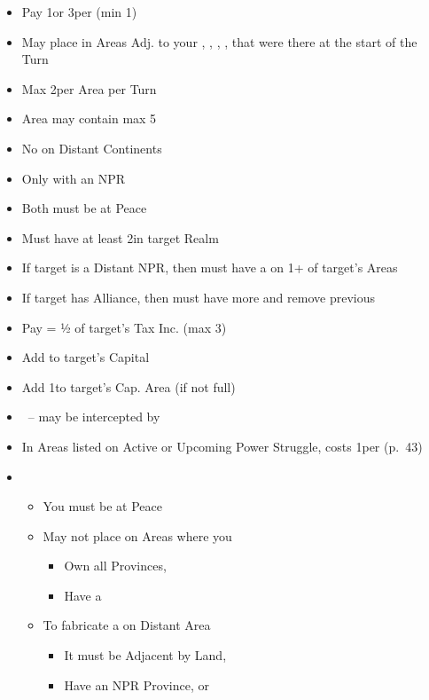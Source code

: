 \documentclass[10pt]{article}
\begin{document}
\begin{itemize}
	\item Pay 1\diplopower or 3\ducats per \influence (min 1\diplopower)
	\item May place \influence in Areas Adj. to your \towns, \vassals, \alliances, \marriages, \influence that were there at the start of the Turn
	\item Max 2\influence per Area per Turn
	\item Area may contain max 5\influence
	\item No \influence on Distant Continents
\end{itemize}

\begin{itemize}
	\item Only with an NPR
	\item Both must be at Peace
	\item Must have at least 2\influence in target Realm
	\item If target is a Distant NPR, then must have a \claim on 1+ of target's Areas
	\item If target has Alliance, then must have more \influence and remove previous \alliance
	\item Pay \diplopower = ½ of target's Tax Inc. (max 3)
	\item Add \alliance to target's Capital
	\item Add 1\influence to target's Cap. Area (if not full)
\end{itemize}

\begin{itemize}
	\item \covertaction~-- may be intercepted by 
	\item In Areas listed on Active or Upcoming Power Struggle, costs 1\diplopower per \claim (p.~43)
	\item {}
	\begin{itemize}
		\item You must be at Peace
		\item May not place \claim on Areas where you
		\begin{itemize}
			\item Own all Provinces,  
			\item Have a \claim
		\end{itemize}
		\item To fabricate a \claim on Distant Area
		\begin{itemize}
			\item It must be Adjacent by Land, 
			\item Have an NPR Province, \vassal or \town
		\end{itemize}
	\end{itemize}
\end{itemize}
\end{document}
